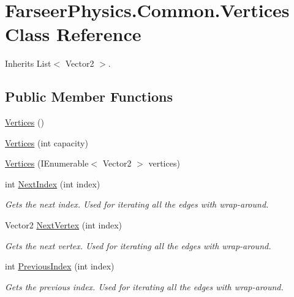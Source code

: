 \hypertarget{class_farseer_physics_1_1_common_1_1_vertices}{\section{Farseer\+Physics.\+Common.\+Vertices Class Reference}
\label{class_farseer_physics_1_1_common_1_1_vertices}
}


Inherits List$<$ Vector2 $>$.

\subsection*{Public Member Functions}
\begin{DoxyCompactItemize}
\item 
\hyperlink{class_farseer_physics_1_1_common_1_1_vertices_a6f1ece304f6d7587578b5437927188a5}{Vertices} ()
\item 
\hyperlink{class_farseer_physics_1_1_common_1_1_vertices_ae375ee5f931a9d2039f138b6a188642d}{Vertices} (int capacity)
\item 
\hyperlink{class_farseer_physics_1_1_common_1_1_vertices_ab0150200302553dc13b0ff4833e7924b}{Vertices} (I\+Enumerable$<$ Vector2 $>$ vertices)
\item 
int \hyperlink{class_farseer_physics_1_1_common_1_1_vertices_a69b1728e34ba6baedf61f4fbfaac504c}{Next\+Index} (int index)
\begin{DoxyCompactList}\small\item\em Gets the next index. Used for iterating all the edges with wrap-\/around. \end{DoxyCompactList}\item 
Vector2 \hyperlink{class_farseer_physics_1_1_common_1_1_vertices_a96bc2619839041bdc5cb2c07951fe274}{Next\+Vertex} (int index)
\begin{DoxyCompactList}\small\item\em Gets the next vertex. Used for iterating all the edges with wrap-\/around. \end{DoxyCompactList}\item 
int \hyperlink{class_farseer_physics_1_1_common_1_1_vertices_a7ad0c05df4e5f5966cbce549dfd852d6}{Previous\+Index} (int index)
\begin{DoxyCompactList}\small\item\em Gets the previous index. Used for iterating all the edges with wrap-\/around. \end{DoxyCompactList}\item 

\end{DoxyCompactItemize}
